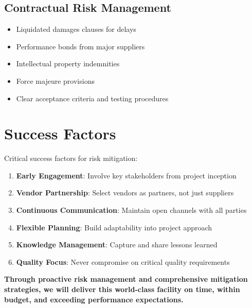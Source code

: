 \subsection{Contractual Risk Management}
\begin{itemize}
\item Liquidated damages clauses for delays
\item Performance bonds from major suppliers
\item Intellectual property indemnities
\item Force majeure provisions
\item Clear acceptance criteria and testing procedures
\end{itemize}

\section{Success Factors}

Critical success factors for risk mitigation:

\begin{enumerate}
\item \textbf{Early Engagement}: Involve key stakeholders from project inception
\item \textbf{Vendor Partnership}: Select vendors as partners, not just suppliers
\item \textbf{Continuous Communication}: Maintain open channels with all parties
\item \textbf{Flexible Planning}: Build adaptability into project approach
\item \textbf{Knowledge Management}: Capture and share lessons learned
\item \textbf{Quality Focus}: Never compromise on critical quality requirements
\end{enumerate}

\vspace{1cm}

\begin{center}
\colorbox{dreamlabSecondary!20}{
\begin{minipage}{0.85\textwidth}
\centering
\textbf{Through proactive risk management and comprehensive mitigation strategies, we will deliver this world-class facility on time, within budget, and exceeding performance expectations.}
\end{minipage}
}
\end{center}